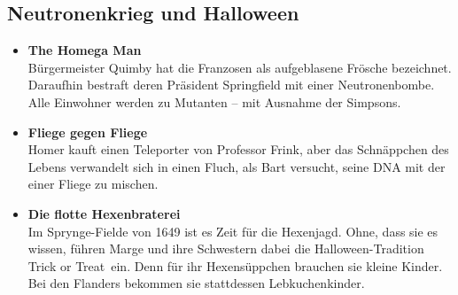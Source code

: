 
	
\subsection{Neutronenkrieg und Halloween}
\begin{itemize}
	\item \textbf{The Homega Man}\\ Bürgermeister Quimby hat die Franzosen als aufgeblasene Frösche bezeichnet. Daraufhin bestraft deren Präsident Springfield mit einer Neutronenbombe. Alle Einwohner werden zu Mutanten -- mit Ausnahme der Simpsons.
	\item \textbf{Fliege gegen Fliege}\\ Homer kauft einen Teleporter von Professor Frink, aber das Schnäppchen des Lebens verwandelt sich in einen Fluch, als Bart versucht, seine DNA mit der einer Fliege zu mischen.
	\item \textbf{Die flotte Hexenbraterei}\\ Im Sprynge-Fielde von 1649 ist es Zeit für die Hexenjagd. Ohne, dass sie es wissen, führen Marge und ihre Schwestern dabei die Halloween-Tradition \glqq Trick or Treat\grqq\ ein. Denn für ihr Hexensüppchen brauchen sie kleine Kinder. Bei den Flanders bekommen sie stattdessen Lebkuchenkinder.
\end{itemize}

